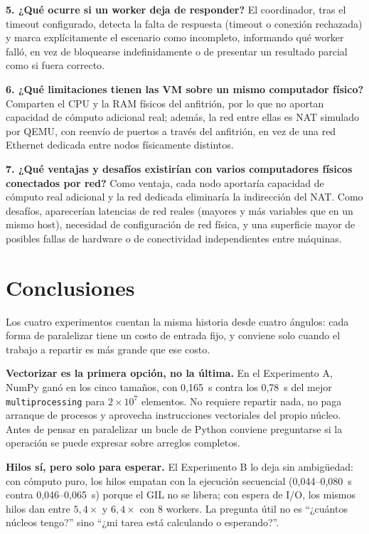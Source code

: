\documentclass[11pt]{article}
\begin{document}
\textbf{5. ¿Qué ocurre si un worker deja de responder?}
El coordinador, tras el timeout configurado, detecta la falta de respuesta
(timeout o conexión rechazada) y marca explícitamente el escenario como
incompleto, informando qué worker falló, en vez de bloquearse indefinidamente
o de presentar un resultado parcial como si fuera correcto.

\textbf{6. ¿Qué limitaciones tienen las VM sobre un mismo computador físico?}
Comparten el CPU y la RAM físicos del anfitrión, por lo que no aportan
capacidad de cómputo adicional real; además, la red entre ellas es NAT
simulado por QEMU, con reenvío de puertos a través del anfitrión, en vez de
una red Ethernet dedicada entre nodos físicamente distintos.

\textbf{7. ¿Qué ventajas y desafíos existirían con varios computadores físicos conectados por red?}
Como ventaja, cada nodo aportaría capacidad de cómputo real adicional y la
red dedicada eliminaría la indirección del NAT. Como desafíos, aparecerían
latencias de red reales (mayores y más variables que en un mismo host),
necesidad de configuración de red física, y una superficie mayor de
posibles fallas de hardware o de conectividad independientes entre
máquinas.

\section{Conclusiones}

Los cuatro experimentos cuentan la misma historia desde cuatro ángulos: cada
forma de paralelizar tiene un costo de entrada fijo, y conviene solo cuando el
trabajo a repartir es más grande que ese costo.

\textbf{Vectorizar es la primera opción, no la última.} En el Experimento A,
NumPy ganó en los cinco tamaños, con 0,165~s contra los 0,78~s del mejor
\texttt{multiprocessing} para $2\times10^7$ elementos. No requiere repartir
nada, no paga arranque de procesos y aprovecha instrucciones vectoriales del
propio núcleo. Antes de pensar en paralelizar un bucle de Python conviene
preguntarse si la operación se puede expresar sobre arreglos completos.

\textbf{Hilos sí, pero solo para esperar.} El Experimento B lo deja sin
ambigüedad: con cómputo puro, los hilos empatan con la ejecución secuencial
(0,044--0,080~s contra 0,046--0,065~s) porque el GIL no se libera; con espera
de I/O, los mismos hilos dan entre $5,4\times$ y $6,4\times$ con 8 workers. La
pregunta útil no es ``¿cuántos núcleos tengo?'' sino ``¿mi tarea está
calculando o esperando?''.
\end{document}
